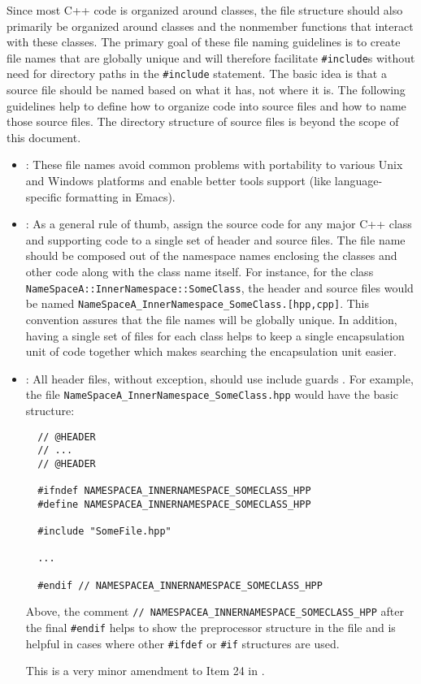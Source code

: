 Since most C++ code is organized around classes, the file structure should
also primarily be organized around classes and the nonmember functions that
interact with these classes.  The primary goal of these file naming guidelines
is to create file names that are globally unique and will therefore facilitate
{}\texttt{\#include}s without need for directory paths in the
{}\texttt{\#include} statement.  The basic idea is that a source file should
be named based on what it has, not where it is.  The following guidelines help
to define how to organize code into source files and how to name those source
files.  The directory structure of source files is beyond the scope of this
document.


\begin{itemize}


{}\item\NOSFFileExtension: These file names avoid common problems with
portability to various Unix and Windows platforms and enable better tools
support (like language-specific formatting in Emacs).


{}\item\NOSFClassFiles: As a general rule of thumb, assign the source code for
any major C++ class and supporting code to a single set of header and source
files.  The file name should be composed out of the namespace names enclosing
the classes and other code along with the class name itself.  For instance,
for the class {}\texttt{NameSpaceA\-::InnerNamespace\-::SomeClass}, the header
and source files would be named
{}\texttt{NameSpaceA\-\_InnerNamespace\-\_SomeClass.[hpp,cpp]}.  This
convention assures that the file names will be globally unique.  In addition,
having a single set of files for each class helps to keep a single
encapsulation unit of code together which makes searching the encapsulation
unit easier.


{}\item\NOSFIncludeGuards: All header files, without exception, should use
include guards {}\cite[Item 24]{C++CodingStandards05}.  For example, the file
{}\texttt{NameSpaceA\-\_InnerNamespace\-\_SomeClass.hpp} would have the basic
structure:

{\small\begin{verbatim}
  // @HEADER
  // ...
  // @HEADER

  #ifndef NAMESPACEA_INNERNAMESPACE_SOMECLASS_HPP
  #define NAMESPACEA_INNERNAMESPACE_SOMECLASS_HPP

  #include "SomeFile.hpp"

  ...

  #endif // NAMESPACEA_INNERNAMESPACE_SOMECLASS_HPP
\end{verbatim}}

Above, the comment {}\texttt{//
NAMESPACEA\-\_INNERNAMESPACE\-\_SOMECLASS\-\_HPP} after the final
{}\texttt{\#endif} helps to show the preprocessor structure in the file and is
helpful in cases where other {}\texttt{\#ifdef} or {}\texttt{\#if} structures
are used.

This is a very minor amendment to Item 24 in {}\cite{C++CodingStandards05}.


\end{itemize}



